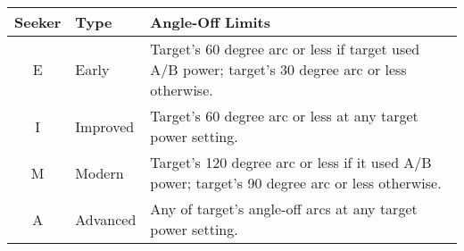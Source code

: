 \begin{onecolumntablefloat}
\begin{onecolumntable}
\begin{tabularx}{\linewidth}{clP}
\toprule
Seeker  &Type       &Angle-Off Limits\\
\midrule
E       &Early      &Target's 60 degree arc or less if target used A/B power; target's 30 degree arc or less otherwise.\\
I       &Improved   &Target's 60 degree arc or less at any target power setting.\\
M       &Modern	    &Target's 120 degree arc or less if it used A/B power; target's 90 degree arc or less otherwise.\\
A       &Advanced   &Any of target's angle-off arcs at any target power setting.\\
\bottomrule
\end{tabularx}
\end{onecolumntable}
\end{onecolumntablefloat}